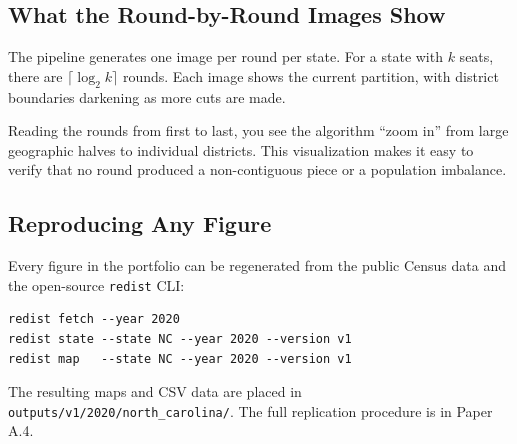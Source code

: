 \subsection*{What the Round-by-Round Images Show}

The pipeline generates one image per round per state.
For a state with $k$ seats, there are $\lceil \log_2 k \rceil$ rounds.
Each image shows the current partition, with district boundaries
darkening as more cuts are made.

Reading the rounds from first to last, you see the algorithm
``zoom in'' from large geographic halves to individual districts.
This visualization makes it easy to verify that no round
produced a non-contiguous piece or a population imbalance.

\subsection*{Reproducing Any Figure}

Every figure in the portfolio can be regenerated from the public
Census data and the open-source \texttt{redist} CLI:

\begin{verbatim}
redist fetch --year 2020
redist state --state NC --year 2020 --version v1
redist map   --state NC --year 2020 --version v1
\end{verbatim}

\noindent The resulting maps and CSV data are placed in
\texttt{outputs/v1/2020/north\_carolina/}.
The full replication procedure is in Paper A.4.
